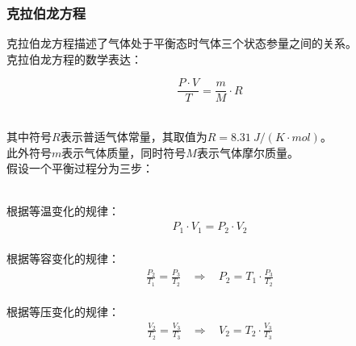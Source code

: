\documentclass[UTF8]{ctexart}
\begin{document}
\subsubsection{克拉伯龙方程}
    \setcounter{equation}{0}
    克拉伯龙方程描述了气体处于平衡态时气体三个状态参量之间的关系。\\[3mm]
    克拉伯龙方程的数学表达：
    \begin{large}
        \begin{equation*}
            \frac{P\cdot V}{T}=\frac{m}{M}\cdot R
        \end{equation*}
    \end{large}\\
    其中符号$R$表示普适气体常量，其取值为$R=8.31~\si{J/(K\cdot mol)}$。\\[3mm]
    此外符号$m$表示气体质量，同时符号$M$表示气体摩尔质量。\\[8mm]
    假设一个平衡过程分为三步：\vspace{5pt}
    \begin{figure}[h]
        \begin{center}
        \end{center}        
    \end{figure}\\
    根据等温变化的规律：
    \begin{align}
        P_1\cdot V_1=P_2\cdot V_2
    \end{align}\\
    根据等容变化的规律：
    \begin{align}
        \frac{P_2}{T_1}=\frac{P_3}{T_2}~~~~\Rightarrow~~~~P_2=T_1\cdot\frac{P_3}{T_2}
    \end{align}\\
    根据等压变化的规律：
    \begin{align}
        \frac{V_2}{T_2}=\frac{V_3}{T_3}~~~~\Rightarrow~~~~V_2=T_2\cdot\frac{V_3}{T_3}
    \end{align}\\
\end{document}
